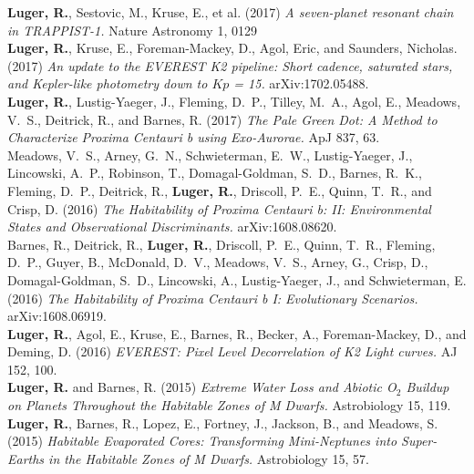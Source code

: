 \documentclass[11pt]{article}
\begin{document}
\textbf{Luger, R.}, Sestovic, M., Kruse, E., et al. (2017) \emph{A seven-planet resonant chain in TRAPPIST-1.} Nature Astronomy 1, 0129\\[-0.1cm]

\textbf{Luger, R.}, Kruse, E., Foreman-Mackey, D., Agol, Eric, and Saunders, Nicholas. (2017) \emph{An update to the EVEREST K2 pipeline: Short cadence, saturated stars, and Kepler-like photometry down to $Kp$ = 15.} arXiv:1702.05488.\\[-0.1cm]

\textbf{Luger, R.}, Lustig-Yaeger, J., Fleming, D.~P., Tilley, M.~A., Agol, E., Meadows, V.~S., Deitrick, R., and Barnes, R. (2017) \emph{The Pale Green Dot: A Method to Characterize Proxima Centauri b using Exo-Aurorae.} ApJ 837, 63.\\[-0.1cm]

Meadows, V.~S., Arney, G.~N., Schwieterman, E.~W., 
Lustig-Yaeger, J., Lincowski, A.~P., Robinson, T., 
Domagal-Goldman, S.~D., Barnes, R.~K., Fleming, D.~P., 
Deitrick, R., \textbf{Luger, R.}, Driscoll, P.~E., Quinn, T.~R., and
Crisp, D. (2016) \emph{The Habitability of Proxima Centauri b: II: Environmental States and Observational Discriminants.} arXiv:1608.08620.\\[-0.1cm]

Barnes, R., Deitrick, R., \textbf{Luger, R.}, Driscoll, P.~E., 
Quinn, T.~R., Fleming, D.~P., Guyer, B., McDonald, D.~V., 
Meadows, V.~S., Arney, G., Crisp, D., Domagal-Goldman, S.~D., 
Lincowski, A., Lustig-Yaeger, J., and Schwieterman, E. (2016)
\emph{The Habitability of Proxima Centauri b I: Evolutionary Scenarios.} arXiv:1608.06919.\\[-0.1cm]

\textbf{Luger, R.}, Agol, E., Kruse, E., Barnes, R., Becker, A., Foreman-Mackey, D., and Deming, D. (2016) \emph{EVEREST: Pixel Level Decorrelation of K2 Light curves.} AJ 152, 100.\\[-0.1cm]

\textbf{Luger, R.} and Barnes, R. (2015) \emph{Extreme Water Loss and Abiotic O$_2$ Buildup on Planets Throughout the Habitable Zones of M Dwarfs.} Astrobiology 15, 119.\\[-0.1cm]

\textbf{Luger, R.}, Barnes, R., Lopez, E., Fortney, J., Jackson, B., and Meadows, S. (2015) \emph{Habitable Evaporated Cores: Transforming Mini-Neptunes into Super-Earths in the Habitable Zones of M Dwarfs.} Astrobiology 15, 57.\\[-0.1cm]
\end{document}
